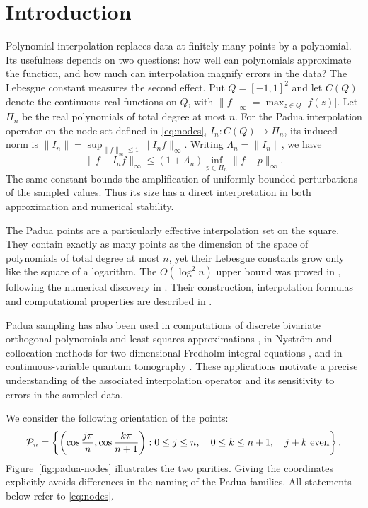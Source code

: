 \section{Introduction}\label{sec:introduction}
Polynomial interpolation replaces data at finitely many points by a polynomial.
Its usefulness depends on two questions: how well can polynomials approximate
the function, and how much can interpolation magnify errors in the data?
The Lebesgue constant measures the second effect. Put $Q=[-1,1]^2$
and let $C(Q)$ denote the continuous real functions on $Q$, with
$\|f\|_\infty=\max_{z\in Q}|f(z)|$. Let $\Pi_n$ be the real
polynomials of total degree at most $n$. For the Padua interpolation operator on the node set defined in
\eqref{eq:nodes}, $I_n:C(Q)\to\Pi_n$, its induced norm is
$\|I_n\|=\sup_{\|f\|_\infty\leq1}\|I_nf\|_\infty$.
Writing $\Lambda_n=\|I_n\|$, we have
\begin{equation}\label{eq:lebesgue-inequality}
 \|f-I_nf\|_\infty\leq (1+\Lambda_n)
       \inf_{p\in\Pi_n}\|f-p\|_\infty.
\end{equation}
The same constant bounds the amplification of uniformly bounded perturbations
of the sampled values. Thus its size has a direct interpretation in both
approximation and numerical stability.

The Padua points are a particularly effective interpolation set on the square.
They contain exactly as many points as the dimension of the space of
polynomials of total degree at most $n$, yet their Lebesgue constants grow
only like the square of a logarithm. The $O(\log^2 n)$ upper bound was proved in
\cite{BosCaliariDeMarchiVianelloXu2006}, following the numerical discovery
in \cite{CaliariDeMarchiVianello2005}. Their construction, interpolation
formulas and computational properties are described in
\cite{CaliariDeMarchiVianello2005,BosCaliariDeMarchiVianelloXu2006,
BosDeMarchiVianelloXu2007,Computational2008,DeMarchi2022}.

Padua sampling has also been used in computations of discrete bivariate
orthogonal polynomials and least-squares approximations
\cite{VanBarelChesnokov2010}, in Nystr\"om and collocation methods for
two-dimensional Fredholm integral equations \cite{LaguardiaRusso2022}, and in
continuous-variable quantum tomography \cite{LandonCardinalGoviaClerk2018}.
These applications motivate a precise understanding of the associated
interpolation operator and its sensitivity to errors in the sampled data.

We consider the following orientation of the points:
\begin{equation}\label{eq:nodes}
 \mathcal P_n=\left\{\left(\cos\frac{j\pi}{n},
                   \cos\frac{k\pi}{n+1}\right):
 0\leq j\leq n,\quad 0\leq k\leq n+1,\quad j+k\ \hbox{even}\right\}.
\end{equation}
Figure~\ref{fig:padua-nodes} illustrates the two parities.
Giving the coordinates explicitly avoids differences in the naming of the
Padua families. All statements below refer to \eqref{eq:nodes}.


